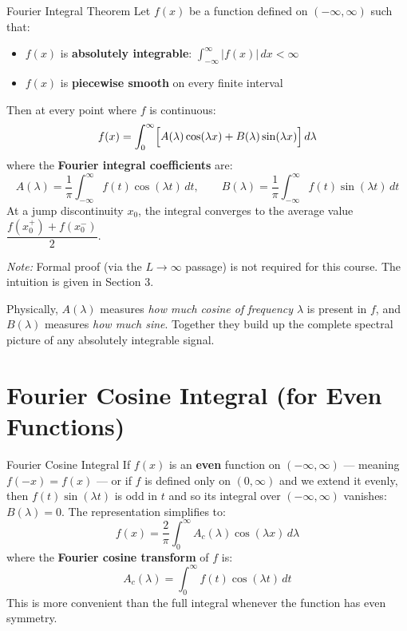 \documentclass[12pt,a4paper]{article}
\begin{document}
\begin{infobox}{Fourier Integral Theorem}
Let $f(x)$ be a function defined on $(-\infty,\infty)$ such that:
\begin{itemize}
  \item $f(x)$ is \textbf{absolutely integrable}: $\displaystyle\int_{-\infty}^{\infty}|f(x)|\,dx < \infty$
  \item $f(x)$ is \textbf{piecewise smooth} on every finite interval
\end{itemize}
Then at every point where $f$ is continuous:
\[
  f(x) = \int_0^\infty \Bigl[A(\lambda)\cos(\lambda x) + B(\lambda)\sin(\lambda x)\Bigr]\,d\lambda
\]
where the \textbf{Fourier integral coefficients} are:
\[
  A(\lambda) = \frac{1}{\pi}\int_{-\infty}^{\infty} f(t)\cos(\lambda t)\,dt, \qquad
  B(\lambda) = \frac{1}{\pi}\int_{-\infty}^{\infty} f(t)\sin(\lambda t)\,dt
\]
At a jump discontinuity $x_0$, the integral converges to the average value $\dfrac{f(x_0^+)+f(x_0^-)}{2}$.

\textit{Note:} Formal proof (via the $L\to\infty$ passage) is not required for this course. The intuition is given in Section 3.
\end{infobox}

Physically, $A(\lambda)$ measures \textit{how much cosine of frequency $\lambda$} is present in $f$, and $B(\lambda)$ measures \textit{how much sine}. Together they build up the complete spectral picture of any absolutely integrable signal.

\section{Fourier Cosine Integral (for Even Functions)}

\begin{infobox}{Fourier Cosine Integral}
If $f(x)$ is an \textbf{even} function on $(-\infty,\infty)$ --- meaning $f(-x)=f(x)$ --- or if $f$ is defined only on $(0,\infty)$ and we extend it evenly, then $f(t)\sin(\lambda t)$ is odd in $t$ and so its integral over $(-\infty,\infty)$ vanishes: $B(\lambda)=0$. The representation simplifies to:
\[
  f(x) = \frac{2}{\pi}\int_0^\infty A_c(\lambda)\cos(\lambda x)\,d\lambda
\]
where the \textbf{Fourier cosine transform} of $f$ is:
\[
  A_c(\lambda) = \int_0^\infty f(t)\cos(\lambda t)\,dt
\]
This is more convenient than the full integral whenever the function has even symmetry.
\end{infobox}
\end{document}
